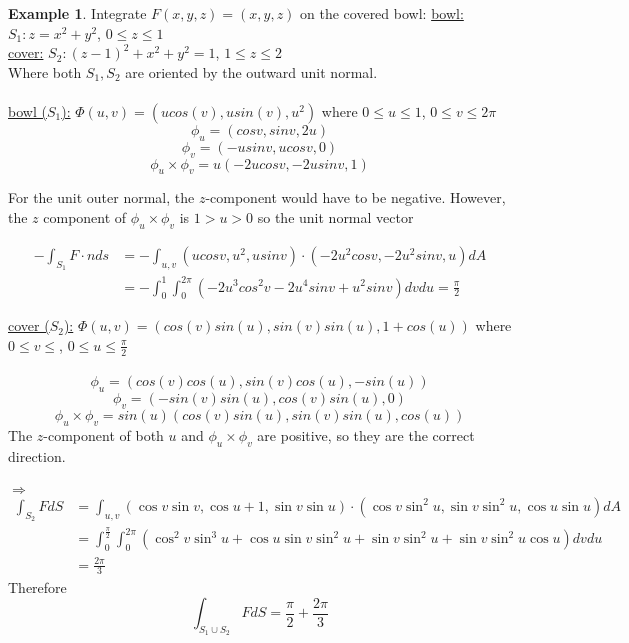 \documentclass[12pt]{article}
\theoremstyle{plain}
\theoremstyle{definition}
\newtheorem{example}[theorem]{Example}
\begin{document}
\begin{example}
	Integrate $F(x,y,z) = (x,y,z)$ on the covered bowl:
	\underline{bowl:} $S_1 : z = x^2 + y^2$, $0 \leq z \leq 1$\\
	\underline{cover:} $S_2 : (z-1)^2 + x^2 + y^2 =1$, $1 \leq z \leq 2$\\
	Where both $S_1, S_2$ are oriented by the outward unit normal.\\
	\\
	\underline{bowl ($S_1$):} $\Phi (u,v) = (ucos(v), usin(v), u^2)$ where $0 \leq u \leq 1$, $0 \leq v \leq 2 \pi$
	$$\phi_u = (cosv, sinv, 2u)$$
	$$\phi_v = (-usinv, ucosv, 0)$$
	$$\phi_u \times \phi_v = u(-2ucosv, -2usinv, 1)$$

	For the unit outer normal, the $z$-component would have to be negative. However, the $z$ component of $\phi_u \times \phi_v$ is $1 > u > 0$ so the unit normal vector

	\begin{align*}
		-\int_{S_1} F \cdot n ds &= - \int_{u,v} (ucosv, u^2, usinv) \cdot (-2u^2 cosv, -2u^2 sinv, u) dA\\
		&= -\int_0^1 \int_0^{2\pi} (-2u^3cos^2 v - 2u^4 sinv + u^2 sinv) dv du = \frac{\pi}{2}
	\end{align*}

	\underline{cover ($S_2$):} $\Phi (u,v) = (cos(v)sin(u), sin(v)sin(u), 1+cos(u))$ where $0\leq v \leq$, $0 \leq u \leq \frac{\pi}{2}$\\
	\\
	$$\phi_u = (cos(v)cos(u),sin(v)cos(u), -sin(u))$$
	$$\phi_v = (-sin(v)sin(u), cos(v)sin(u), 0)$$
	$$\phi_u \times \phi_v =sin(u)(cos(v)sin(u), sin(v)sin(u), cos(u))$$
	The $z$-component of both $u$ and $\phi_u \times \phi_v$ are positive, so they are the correct direction.
	\\
	\\
	$\Longrightarrow$ \begin{align*}
		\int_{S_2} F dS &= \int_{u,v} (\cos v \sin v, \cos u + 1, \sin v \sin u)\cdot (\cos v \sin^2 u, \sin v \sin^2 u, \cos u \sin u) dA\\
		&= \int_0^{\frac{\pi}{2}} \int^{2\pi}_0 (\cos^2 v \sin^3 u + \cos u \sin v \sin^2 u + \sin v \sin^2 u + \sin v \sin^2 u \cos u) dv du\\
		&= \frac{2\pi}{3}
\end{align*}
Therefore $$\int_{S_1 \cup S_2} F dS = \frac{\pi}{2} + \frac{2\pi}{3}$$
\end{example}

\newpage
\end{document}
